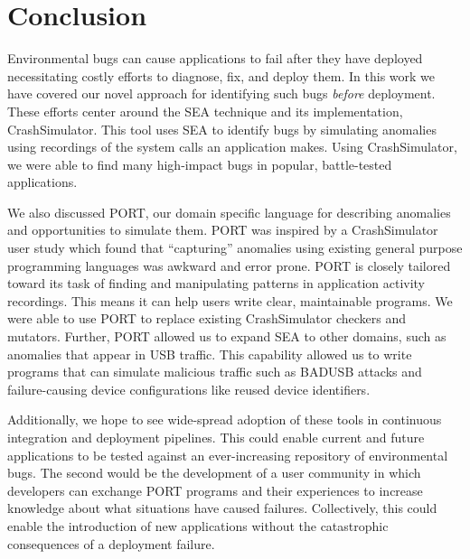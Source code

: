 \chapter{Conclusion}
\label{chap:conclusion}

Environmental bugs can cause applications to fail after they have deployed necessitating costly efforts to diagnose,
fix,
and deploy them.
In this work we have covered our novel approach for identifying such bugs \textit{before} deployment.
These efforts center around the SEA technique and its implementation,
CrashSimulator.
This tool uses SEA to identify bugs by simulating anomalies using recordings of the system calls an application makes.
Using CrashSimulator,
we were able to find many high-impact bugs in popular, battle-tested applications.

We also discussed PORT,
our domain specific language for describing anomalies and opportunities to simulate them.
PORT was inspired by a CrashSimulator user study which found that ``capturing'' anomalies using existing
general purpose programming languages was awkward and error prone.
PORT is closely tailored toward its task of
finding and manipulating patterns in application activity recordings.
This means it can help users write clear,
maintainable programs.
We were able to use PORT to replace existing CrashSimulator checkers and mutators.
Further, PORT allowed us to expand SEA to other domains, such as anomalies that appear in USB traffic.
This capability allowed us to write programs that can simulate malicious traffic such as BADUSB attacks
and failure-causing device configurations like reused device identifiers.

Additionally, 
we hope to see wide-spread adoption of these
tools in continuous
integration and deployment pipelines. This could enable current and future
applications to be tested against an ever-increasing repository of
environmental bugs.
The second would be the development of a user community in which developers can exchange PORT programs and their experiences to increase knowledge about what situations have caused failures.  Collectively, 
this could enable the introduction of new applications without the catastrophic consequences of a deployment failure. 

